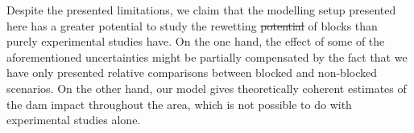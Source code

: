 \documentclass[bg, manuscript]{copernicus}
\providecommand{\DIFadd}[1]{{\protect\color{blue}\uwave{#1}}} %
\providecommand{\DIFdel}[1]{{\protect\color{red}\sout{#1}}}                      %
\providecommand{\DIFaddbegin}{} %
\providecommand{\DIFaddend}{} %
\providecommand{\DIFdelbegin}{} %
\providecommand{\DIFdelend}{} %
\begin{document}

Despite the presented limitations, we claim that the modelling setup presented here has a greater potential to study the rewetting \DIFdelbegin \DIFdel{potential }\DIFdelend \DIFaddbegin \DIFadd{ability }\DIFaddend of blocks than purely experimental studies have.
On the one hand, the effect of some of the aforementioned uncertainties might be partially compensated by the fact that we have only presented relative comparisons between blocked and non-blocked scenarios.
On the other hand, our model gives theoretically coherent estimates of the dam impact throughout the area, which is not possible to do  with  experimental studies alone.
\end{document}
